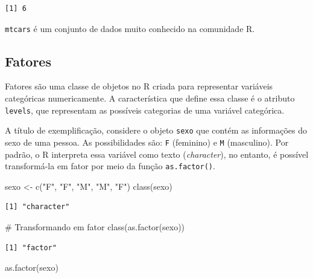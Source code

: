 \documentclass[
  12pt,
  letterpaper,
  DIV=11,
  numbers=noendperiod]{scrreprt}
\newenvironment{Shaded}{\begin{snugshade}}{\end{snugshade}}
\newcommand{\CommentTok}[1]{\textcolor[rgb]{0.37,0.37,0.37}{#1}}
\newcommand{\FunctionTok}[1]{\textcolor[rgb]{0.28,0.35,0.67}{#1}}
\newcommand{\NormalTok}[1]{\textcolor[rgb]{0.00,0.23,0.31}{#1}}
\newcommand{\OtherTok}[1]{\textcolor[rgb]{0.00,0.23,0.31}{#1}}
\newcommand{\StringTok}[1]{\textcolor[rgb]{0.13,0.47,0.30}{#1}}
\theoremstyle{definition}
\theoremstyle{exemplo}
\begin{document}
\begin{verbatim}
[1] 6
\end{verbatim}

\noindent \texttt{mtcars} é um conjunto de dados muito conhecido na
comunidade R.

\subsection{Fatores}\label{fatores}

Fatores são uma classe de objetos no R criada para representar variáveis
categóricas numericamente. A característica que define essa classe é o
atributo \texttt{levels}, que representam as possíveis categorias de uma
variável categórica.

A título de exemplificação, considere o objeto \texttt{sexo} que contém
as informações do sexo de uma pessoa. As possibilidades são: \texttt{F}
(feminino) e \texttt{M} (masculino). Por padrão, o R interpreta essa
variável como texto (\emph{character}), no entanto, é possível
transformá-la em fator por meio da função \texttt{as.factor()}.

\begin{Shaded}
\begin{Highlighting}[]
\NormalTok{sexo }\OtherTok{\textless{}{-}} \FunctionTok{c}\NormalTok{(}\StringTok{"F"}\NormalTok{, }\StringTok{"F"}\NormalTok{, }\StringTok{"M"}\NormalTok{, }\StringTok{"M"}\NormalTok{, }\StringTok{"F"}\NormalTok{)}
\FunctionTok{class}\NormalTok{(sexo)}
\end{Highlighting}
\end{Shaded}

\begin{verbatim}
[1] "character"
\end{verbatim}

\begin{Shaded}
\begin{Highlighting}[]
\CommentTok{\# Transformando em fator}
\FunctionTok{class}\NormalTok{(}\FunctionTok{as.factor}\NormalTok{(sexo))}
\end{Highlighting}
\end{Shaded}

\begin{verbatim}
[1] "factor"
\end{verbatim}

\begin{Shaded}
\begin{Highlighting}[]
\FunctionTok{as.factor}\NormalTok{(sexo)}
\end{Highlighting}
\end{Shaded}
\end{document}
